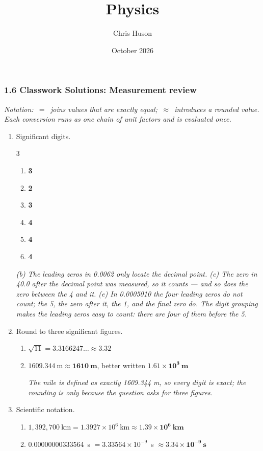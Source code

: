 \documentclass[12pt, twoside]{article}
\title{Physics}
\author{Chris Huson}
\date{October 2026}
\begin{document}
\subsubsection*{1.6 Classwork Solutions: Measurement review}

\emph{Notation: \,$=$\, joins values that are exactly equal; \,$\approx$\, introduces a
rounded value. Each conversion runs as one chain of unit factors and is evaluated once.}

\begin{enumerate}[itemsep=0.25cm]

\item Significant digits.
  \begin{multicols}{3}
    \begin{enumerate}[itemsep=0.1cm]
      \item \textbf{3}
      \item \textbf{2}
      \item \textbf{3}
      \item \textbf{4}
      \item \textbf{4}
      \item \textbf{4}
    \end{enumerate}
  \end{multicols}
  \emph{(b) The leading zeros in 0.0062 only locate the decimal point. (c) The zero in
  40.0 after the decimal point was measured, so it counts --- and so does the zero
  between the 4 and it. (e) In \num{0.0005010} the four leading zeros do not count;
  the 5, the zero after it, the 1, and the final zero do. The digit grouping makes the
  leading zeros easy to count: there are four of them before the 5.}

\item Round to three significant figures.
  \begin{enumerate}[itemsep=0.15cm]
    \item $\sqrt{11} = 3.3166247\ldots \approx \mathbf{3.32}$
    \item $1609.344~\text{m} \approx \mathbf{1610~\textbf{m}}$, better written
      $\mathbf{1.61 \times 10^{3}~\textbf{m}}$

      \emph{The mile is defined as exactly 1609.344 m, so every digit is exact; the
      rounding is only because the question asks for three figures.}
  \end{enumerate}

\item Scientific notation.
  \begin{enumerate}[itemsep=0.15cm]
    \item $1{,}392{,}700~\text{km} = 1.3927 \times 10^{6}~\text{km}
      \approx \mathbf{1.39 \times 10^{6}~\textbf{km}}$
    \item \num{0.00000000333564}~s $= 3.33564 \times 10^{-9}$~s
      $\approx \mathbf{3.34 \times 10^{-9}~\textbf{s}}$


\end{enumerate}
\end{enumerate}
\end{document}
